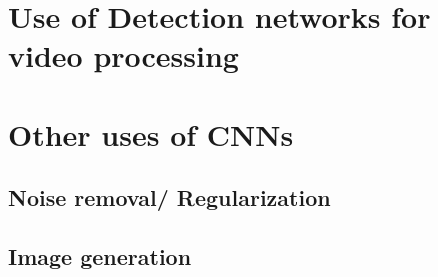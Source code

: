 \section{Use of Detection networks for video processing}

\section{Other uses of CNNs}
\subsection{Noise removal/ Regularization}
\subsection{Image generation}



